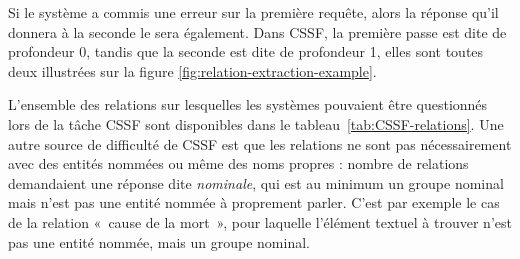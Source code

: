 \documentclass[PhD-Yoann-Dupont.tex]{subfiles}
\begin{document}
Si le système a commis une erreur sur la première requête, alors la réponse qu'il donnera à la seconde le sera également. Dans CSSF, la première passe est dite de profondeur 0, tandis que la seconde est dite de profondeur 1, elles sont toutes deux illustrées sur la figure \ref{fig:relation-extraction-example}.

L'ensemble des relations sur lesquelles les systèmes pouvaient être questionnés lors de la tâche CSSF sont disponibles dans le tableau\ \ref{tab:CSSF-relations}. Une autre source de difficulté de CSSF est que les relations ne sont pas nécessairement avec des entités nommées ou même des noms propres : nombre de relations demandaient une réponse dite \emph{nominale}, qui est au minimum un groupe nominal mais n'est pas une entité nommée à proprement parler. C'est par exemple le cas de la relation «\ cause de la mort\ », pour laquelle l'élément textuel à trouver n'est pas une entité nommée, mais un groupe nominal.
\end{document}

